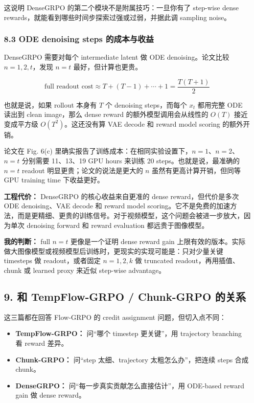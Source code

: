 这说明 DenseGRPO 的第二个模块不是附属技巧：一旦你有了 step-wise dense rewards，就能看到哪些时间步探索过强或过弱，并据此调 sampling noise。

\subsubsection{8.3 ODE denoising steps 的成本与收益}

DenseGRPO 需要对每个 intermediate latent 做 ODE denoising。论文比较 \(n=1,2,t\)，发现 \(n=t\) 最好，但计算也更贵。

\[
\text{full readout cost}
\approx T + (T-1) + \cdots + 1
= \frac{T(T+1)}{2}
\]

也就是说，如果 rollout 本身有 \(T\) 个 denoising steps，而每个 \(x_t\) 都用完整 ODE 读出到 clean image，那么 dense reward 的额外模型调用会从线性的 \(O(T)\) 接近变成平方级 \(O(T^2)\)。这还没有算 VAE decode 和 reward model scoring 的额外开销。

论文在 Fig. 6(c) 里确实报告了训练成本：在相同实验设置下，\(n=1\)、\(n=2\)、\(n=t\) 分别需要 11、13、19 GPU hours 来训练 20 steps。也就是说，最准确的 \(n=t\) readout 明显更贵；论文的说法是更大的 \(n\) 虽然有更高计算开销，但同等 GPU training time 下收益更好。

\begin{warnbox}
\textbf{工程代价：} DenseGRPO 的核心收益来自更准的 dense reward，但代价是多次 ODE denoising、VAE decode 和 reward model scoring。它不是免费的加速方法，而是更精细、更贵的训练信号。对于视频模型，这个问题会被进一步放大，因为单次 denoising forward 和 reward evaluation 都远贵于图像模型。
\end{warnbox}

\textbf{我的判断：} full \(n=t\) 更像是一个证明 dense reward gain 上限有效的版本。实际做大图像模型或视频模型后训练时，更现实的实现可能是：只对少量关键 timesteps 做 readout，或者固定 \(n=1,2,k\) 做 truncated readout，再用插值、chunk 或 learned proxy 来近似 step-wise advantage。

\subsection{9. 和 TempFlow-GRPO / Chunk-GRPO 的关系}

这三篇都在回答 Flow-GRPO 的 credit assignment 问题，但切入点不同：

\begin{itemize}[leftmargin=1.5em]
  \item \textbf{TempFlow-GRPO：} 问“哪个 timestep 更关键”，用 trajectory branching 看 reward 差异。
  \item \textbf{Chunk-GRPO：} 问“step 太细、trajectory 太粗怎么办”，把连续 steps 合成 chunk。
  \item \textbf{DenseGRPO：} 问“每一步真实贡献怎么直接估计”，用 ODE-based reward gain 做 dense reward。
\end{itemize}

